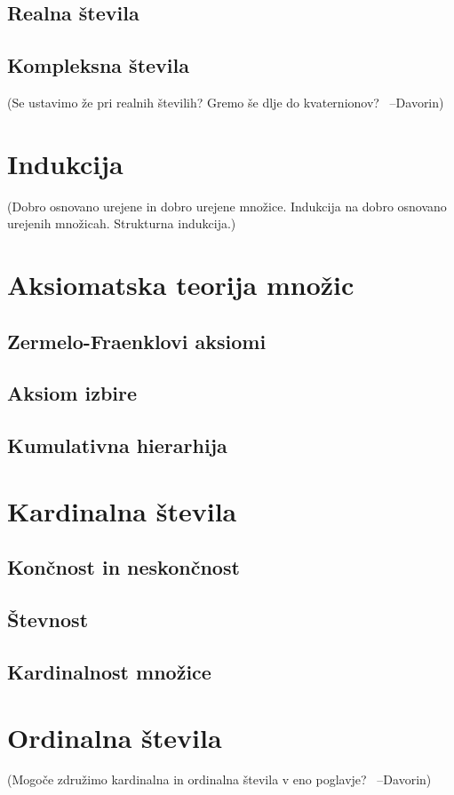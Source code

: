 \documentclass[11pt,a4paper,twoside]{book}
\newcommand{\davorin}[1]{{\small\textcolor{davorincolor}{(#1 \ \mbox{--Davorin})}}}
\newcommand{\note}[1]{{\small\textcolor{notecolor}{(#1)}}}
\begin{document}
		\section{Realna števila}
		\section{Kompleksna števila}
			\davorin{Se ustavimo že pri realnih številih? Gremo še dlje do kvaternionov?}
	
	\chapter{Indukcija}
		\note{Dobro osnovano urejene in dobro urejene množice. Indukcija na dobro osnovano urejenih množicah. Strukturna indukcija.}
	
	\chapter{Aksiomatska teorija množic}
		\section{Zermelo-Fraenklovi aksiomi}
		\section{Aksiom izbire}
		\section{Kumulativna hierarhija}
	
	\chapter{Kardinalna števila}
		\section{Končnost in neskončnost}
		\section{Števnost}
		\section{Kardinalnost množice}
	
	\chapter{Ordinalna števila}
		\davorin{Mogoče združimo kardinalna in ordinalna števila v eno poglavje?}
	
	
\end{document}
